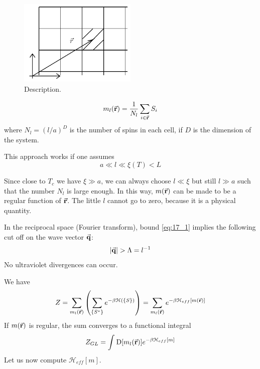 \documentclass[../main/main.tex]{subfiles}
\begin{document}
\begin{figure}[h!]
\centering
\includegraphics[width=0.5\textwidth]{../lessons/17_image/1.pdf}
\caption{\label{fig:17_1} Description.}
\end{figure}

\begin{equation}
  m_l (\va{r}) = \frac{1}{N_l} \sum_{i \in \va{r}}^{} S_i
\end{equation}
where \( N_l = (l/a)^D \) is the number of spins in each cell, if \( D \) is the dimension of the system.
\begin{remark}
This approach works if one assumes
\begin{equation}
  a \ll l \ll \xi (T) < L
  \label{eq:17_1}
\end{equation}
\end{remark}
\begin{remark}
Since close to \( T_c \) we have \( \xi \gg a \), we can always choose \( l \ll \xi  \) but still \( l \gg a \) such that the number \( N_l \) is large enough.
In this way, \( m(\va{r}) \) can be made to be a regular function of \( \va{r} \).
The little \( l \) cannot go to zero, because it is a physical quantity.
\end{remark}
\begin{remark}
In the reciprocal space (Fourier transform), bound \eqref{eq:17_1} implies the following cut off on the wave vector \( \va{q} \):
\begin{equation}
  \abs{\va{q}} > \Lambda  = l^{-1}
\end{equation}
No ultraviolet divergences can occur.
\end{remark}
We have
\begin{equation}
  Z = \sum_{m_l (\va{r})}^{} \qty(\sum_{\{ S^* \}  }^{} e^{-\beta \mathcal{H} ( \{ S \}  )}   )
 = \sum_{m_l(\va{r})}^{} e^{-\beta \mathcal{H}_{eff} [m(\va{r})]}
\end{equation}
If \( m(\va{r}) \) is regular, the sum converges to a functional integral
\begin{equation}
   Z_{GL} = \int_{}^{} \text{D}  \qty[m_l (\va{r})]  e^{-\beta \mathcal{H}_{eff}[m]}
\end{equation}
Let us now compute \( \mathcal{H}_{eff} [m] \).
\end{document}
